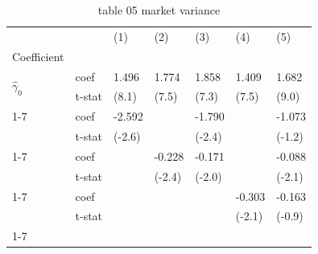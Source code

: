 \begin{table}[htbp]
  \centering
  \caption{table 05 market variance}
  \label{tab:table_05_market_variance}
  \begin{tabular}{lllllll}
\toprule
 &  & (1) & (2) & (3) & (4) & (5) \\
Coefficient &  &  &  &  &  &  \\
\midrule
\multirow[t]{2}{*}{$\hat{\gamma}_0$} & coef & 1.496 & 1.774 & 1.858 & 1.409 & 1.682 \\
 & t-stat & (8.1) & (7.5) & (7.3) & (7.5) & (9.0) \\
\cline{1-7}
\multirow[t]{2}{*}{$\hat{\gamma}_B$} & coef & -2.592 &  & -1.790 &  & -1.073 \\
 & t-stat & (-2.6) &  & (-2.4) &  & (-1.2) \\
\cline{1-7}
\multirow[t]{2}{*}{$\hat{\gamma}_{\sigma^2}$} & coef &  & -0.228 & -0.171 &  & -0.088 \\
 & t-stat &  & (-2.4) & (-2.0) &  & (-2.1) \\
\cline{1-7}
\multirow[t]{2}{*}{$\hat{\gamma}_{int}$} & coef &  &  &  & -0.303 & -0.163 \\
 & t-stat &  &  &  & (-2.1) & (-0.9) \\
\cline{1-7}
\bottomrule
\end{tabular}

\end{table}

